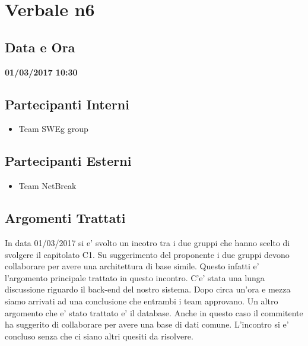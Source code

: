 \documentclass[12pt,a4paper,titlepage]{article}
\begin{document}
\section*{Verbale n6}
\subsection*{Data e Ora}
\begin{center}
\textbf{01/03/2017 10:30}
\end{center}
\subsection*{Partecipanti Interni}
\begin{itemize}
	\item Team SWEg group
\end{itemize}
\subsection*{Partecipanti Esterni}
\begin{itemize}
	\item Team NetBreak
\end{itemize}
\subsection*{Argomenti Trattati}
In data 01/03/2017 si e' svolto un incotro tra i due gruppi che hanno scelto di svolgere il capitolato C1. Su suggerimento del proponente i due gruppi devono collaborare per avere una architettura di base simile. Questo infatti e' l'argomento principale trattato in questo incontro. C'e' stata una lunga discussione riguardo il back-end del nostro sistema. Dopo circa un'ora e mezza siamo arrivati ad una conclusione che entrambi i team approvano. Un altro argomento che e' stato trattato e' il database. Anche in questo caso il commitente ha suggerito di collaborare per avere una base di dati comune. L'incontro si e' concluso senza che ci siano altri quesiti da risolvere.
\end{document}
